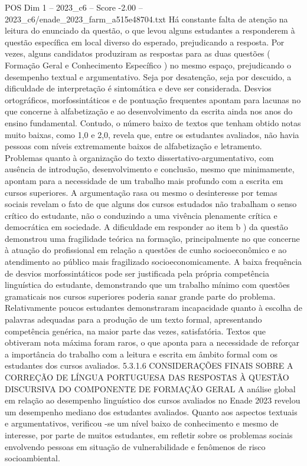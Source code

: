 \begin{textsample}{POS Dim 1 – 2023\_c6 – Score -2.00 – 2023\_c6/enade\_2023\_farm\_a515e48704.txt}
Há constante falta de atenção na leitura do enunciado da questão, o que levou alguns estudantes a responderem à questão específica em local diverso do esperado, prejudicando a resposta.
Por vezes, alguns candidatos produziram as respostas para as duas questões ( Formação Geral e Conhecimento Específico ) no mesmo espaço, prejudicando o desempenho textual e argumentativo.
Seja por desatenção, seja por descuido, a dificuldade de interpretação é sintomática e deve ser considerada.
Desvios ortográficos, morfossintáticos e de pontuação frequentes apontam para lacunas no que concerne à alfabetização e ao desenvolvimento da escrita ainda nos anos do ensino fundamental.
Contudo, o número baixo de textos que tenham obtido notas muito baixas, como 1,0 e 2,0, revela que, entre os estudantes avaliados, não havia pessoas com níveis extremamente baixos de alfabetização e letramento.
Problemas quanto à organização do texto dissertativo-argumentativo, com ausência de introdução, desenvolvimento e conclusão, mesmo que minimamente, apontam para a necessidade de um trabalho mais profundo com a escrita em cursos superiores.
A argumentação rasa ou mesmo o desinteresse por temas sociais revelam o fato de que alguns dos cursos estudados não trabalham o senso crítico do estudante, não o conduzindo a uma vivência plenamente crítica e democrática em sociedade.
A dificuldade em responder ao item b ) da questão demonstrou uma fragilidade teórica na formação, principalmente no que concerne à atuação do profissional em relação a questões de cunho socioeconômico e ao atendimento ao público mais fragilizado socioeconomicamente.
A baixa frequência de desvios morfossintáticos pode ser justificada pela própria competência linguística do estudante, demonstrando que um trabalho mínimo com questões gramaticais nos cursos superiores poderia sanar grande parte do problema.
Relativamente poucos estudantes demonstraram incapacidade quanto à escolha de palavras adequadas para a produção de um texto formal, apresentando competência genérica, na maior parte das vezes, satisfatória.
Textos que obtiveram nota máxima foram raros, o que aponta para a necessidade de reforçar a importância do trabalho com a leitura e escrita em âmbito formal com os estudantes dos cursos avaliados. 5.3.1.6 CONSIDERAÇÕES FINAIS SOBRE A CORREÇÃO DE LÍNGUA PORTUGUESA DAS RESPOSTAS À QUESTÃO DISCURSIVA DO COMPONENTE DE FORMAÇÃO GERAL A análise global em relação ao desempenho linguístico dos cursos avaliados no Enade 2023 revelou um desempenho mediano dos estudantes avaliados.
Quanto aos aspectos textuais e argumentativos, verificou -se um nível baixo de conhecimento e mesmo de interesse, por parte de muitos estudantes, em refletir sobre os problemas sociais envolvendo pessoas em situação de vulnerabilidade e fenômenos de risco socioambiental.

\end{textsample}
